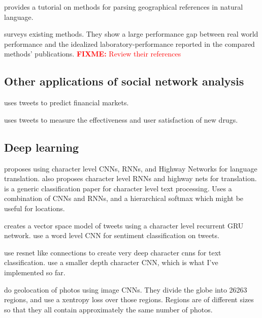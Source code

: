\documentclass{article}
\newcommand{\fixme}[1]{\textcolor{red}{\textbf{FIXME:} {#1}}}
\begin{document}
\citet{leidner2011detecting} provides a tutorial on methods for parsing geographical references in natural language.

\citet{jurgens2015geolocation} surveys existing methods.
They show a large performance gap between real world performance and the idealized laboratory-performance reported in the compared methods' publications.
\fixme{Review their references}


\subsection{Other applications of social network analysis}

\citet{ruiz2012correlating} uses tweets to predict financial markets.

\citet{wiley2014pharmaceutical} uses tweets to measure the effectiveness and user satisfaction of new drugs.


\subsection{Deep learning}

\citet{kim2016character} proposes using character level CNNs, RNNs, and Highway Networks for language translation.
\citet{chung2016character} also proposes character level RNNs and highway nets for translation.
\citet{jozefowicz2016exploring} is a generic classification paper for character level text processing.  
Uses a combination of CNNs and RNNs, and a hierarchical softmax which might be useful for locations.

\citet{dhingra2016tweet2vec} creates a vector space model of tweets using a character level recurrent GRU network.
\citet{severyn2015unitn} use a word level CNN for sentiment classification on tweets.

\citet{conneau2017very} use resnet like connections to create very deep character cnns for text classification.
\citet{zhang2015character} use a smaller depth character CNN, which is what I've implemented so far.

\citet{weyand2016planet} do geolocation of photos using image CNNs.
They divide the globe into 26263 regions, and use a xentropy loss over those regions.
Regions are of different sizes so that they all contain approximately the same number of photos.


\clearpage


\end{document}
